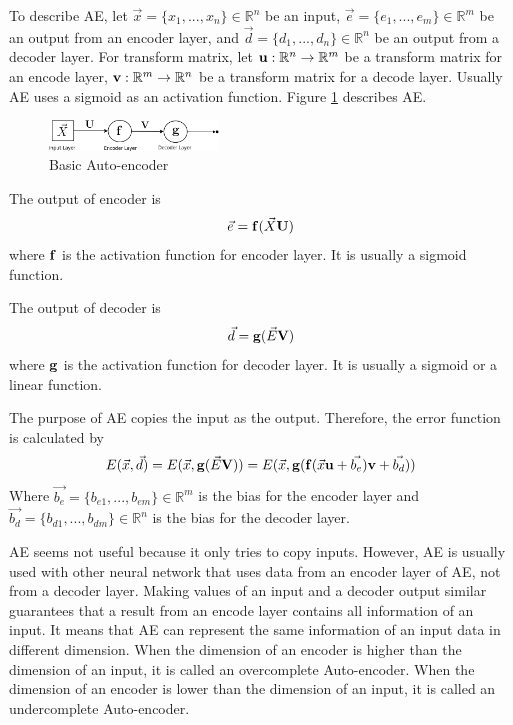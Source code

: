 \documentclass[draft,dvipsnames]{drexel-thesis}
\begin{document}
\begin{thesis}
To describe AE, let $\vec{x} = \{x_1, ..., x_n\} \in \mathbb{R}^n$ be an input, $\vec{e} = \{e_1, ..., e_m\} \in \mathbb{R}^m$ be an output from an encoder layer, and $\vec{d} = \{d_1, ..., d_n\} \in \mathbb{R}^n$ be an output from a decoder layer. For transform matrix, let $\bold{u}: \mathbb{R}^n \rightarrow \mathbb{R}^m$ be a transform matrix for an encode layer, $\bold{v}: \mathbb{R}^m \rightarrow \mathbb{R}^n$ be a transform matrix for a decode layer. Usually AE uses a sigmoid as an activation function. Figure \ref{fig:basic_AE} describes AE.

\begin{figure}[t!]
    \centering
    \includegraphics[width=0.4\textwidth]{pictures/figures/basic_AE.png}
    \caption{Basic Auto-encoder}
    \label{fig:basic_AE}
\end{figure}

The output of encoder is
$$\vec{e} = \bold{f}(\vec{X}\bold{U})$$
where $\bold{f}$ is the activation function for encoder layer. It is usually a sigmoid function.

The output of decoder is
$$\vec{d} = \bold{g}(\vec{E}\bold{V})$$
where $\bold{g}$ is the activation function for decoder layer. It is usually a sigmoid or a linear function.

The purpose of AE copies the input as the output. Therefore, the error function is calculated by
$$E(\vec{x}, \vec{d}) = E(\vec{x}, \bold{g}(\vec{E}\bold{V})) = E(\vec{x}, \bold{g}(\bold{f}(\vec{x}\bold{u}+\vec{b_e})\bold{v}+\vec{b_d}))$$
Where $\vec{b_e} = \{b_{e1}, ..., b_{em}\} \in \mathbb{R}^m$ is the bias for the encoder layer and $\vec{b_d} = \{b_{d1}, ..., b_{dm}\} \in \mathbb{R}^n$ is the bias for the decoder layer.

AE seems not useful because it only tries to copy inputs. However, AE is usually used with other neural network that uses data from an encoder layer of AE, not from a decoder layer. Making values of an input and a decoder output similar guarantees that a result from an encode layer contains all information of an input. It means that AE can represent the same information of an input data in different dimension. When the dimension of an encoder is higher than the dimension of an input, it is called an overcomplete Auto-encoder. When the dimension of an encoder is lower than the dimension of an input, it is called an undercomplete Auto-encoder.


\end{thesis}
\end{document}
